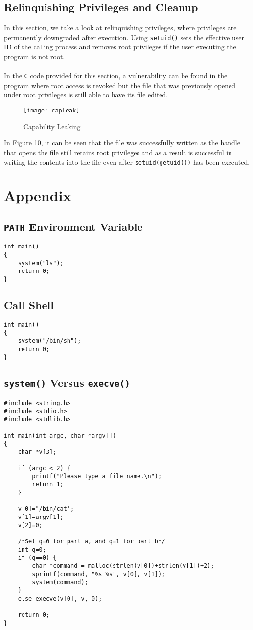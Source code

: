 \documentclass[a4paper,12pt]{article}
\begin{document}
\subsection{Relinquishing Privileges and Cleanup}
In this section, we take a look at relinquishing privileges, where privileges are permanently downgraded after execution. Using \texttt{setuid()} sets the effective user ID of the calling process and removes root privileges if the user executing the program is not root.\\\\In the \texttt{C} code provided for \hyperref[Appsec:3.72]{this section}, a vulnerability can be found in the program where root access is revoked but the file that was previously opened under root privileges is still able to have its file edited. 
\begin{figure}[H]
	\centering
	\texttt{[image: capleak]}
	\caption{Capability Leaking}
	\label{fig:capleak}
\end{figure}
\noindent In Figure 10, it can be seen that the file was successfully written as the handle that opens the file still retains root privileges and as a result is successful in writing the contents into the file even after \texttt{setuid(getuid())} has been executed.
\newpage
\section{Appendix}
\subsection{\texttt{PATH} Environment Variable}
\label{Appsec:3.6}
\begin{verbatim}
int main()
{
    system("ls");
    return 0;
}
\end{verbatim}
\subsection{Call Shell}
\label{Appsec:3.6.2}
\begin{verbatim}
int main()
{
    system("/bin/sh");
    return 0;
}
\end{verbatim}
\subsection{\texttt{system()} Versus \texttt{execve()}}
\label{Appsec:sysexec}
\begin{verbatim}
#include <string.h>
#include <stdio.h>
#include <stdlib.h>

int main(int argc, char *argv[])
{
	char *v[3];
	
	if (argc < 2) {
		printf("Please type a file name.\n");
		return 1;
	}
	
	v[0]="/bin/cat";
	v[1]=argv[1];
	v[2]=0;
	
	/*Set q=0 for part a, and q=1 for part b*/
	int q=0;
	if (q==0) {
	    char *command = malloc(strlen(v[0])+strlen(v[1])+2);
	    sprintf(command, "%s %s", v[0], v[1]);
	    system(command);
	}
	else execve(v[0], v, 0);
	
	return 0;
}
\end{verbatim}
\end{document}
